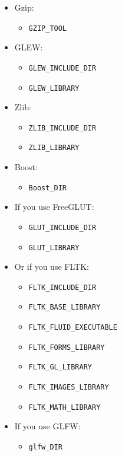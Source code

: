 \documentclass[11pt,oneside,a4paper,final]{article}
\begin{document}
\begin{itemize}
	\item \Gls{Gzip}:
	\begin{itemize}
		\item \verb|GZIP_TOOL|
	\end{itemize}

	\item \Gls{GLEW}:
	\begin{itemize}
		\item \verb|GLEW_INCLUDE_DIR|
		\item \verb|GLEW_LIBRARY|
	\end{itemize}
	
	\item Zlib:
	\begin{itemize}
		\item \verb|ZLIB_INCLUDE_DIR|
		\item \verb|ZLIB_LIBRARY|
	\end{itemize}
	
	\item Boost:
	\begin{itemize}
		\item \verb|Boost_DIR|
	\end{itemize}

	\item If you use FreeGLUT:
	\begin{itemize}
		\item \verb|GLUT_INCLUDE_DIR|
		\item \verb|GLUT_LIBRARY|
	\end{itemize}

	\item Or if you use \Gls{FLTK}:
	\begin{itemize}
		\item \verb|FLTK_INCLUDE_DIR|
		\item \verb|FLTK_BASE_LIBRARY|
		\item \verb|FLTK_FLUID_EXECUTABLE|
		\item \verb|FLTK_FORMS_LIBRARY|
		\item \verb|FLTK_GL_LIBRARY|
		\item \verb|FLTK_IMAGES_LIBRARY|
		\item \verb|FLTK_MATH_LIBRARY|
	\end{itemize}

	\item If you use GLFW:
	\begin{itemize}
		\item \verb|glfw_DIR|
	\end{itemize}


\end{itemize}
\end{document}
